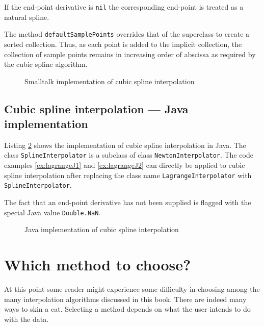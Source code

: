\documentclass[twoside]{book}
\begin{document}
If the end-point derivative is {\tt nil} the corresponding
end-point is treated as a natural spline.

The method {\tt defaultSamplePoints} overrides that of the
superclass to create a sorted collection. Thus, as each point is
added to the implicit collection, the collection of sample points
remains in increasing order of abscissa as required by the cubic
spline algorithm.

\begin{figure}\begin{listing} \caption{Smalltalk implementation of cubic spline interpolation} \label{ls:spline}

\end{listing}\end{figure}

\subsection{Cubic spline interpolation --- Java implementation}
Listing \ref{lj:spline} shows the implementation of cubic spline
interpolation in Java. The class {\tt SplineInterpolator} is a
subclass of class {\tt NewtonInterpolator}.  The code examples
\ref{ex:lagrangeJ1} and \ref{ex:lagrangeJ2} can directly be
applied to cubic spline interpolation after replacing the class
name {\tt LagrangeInterpolator} with {\tt SplineInterpolator}.

The fact that an end-point derivative has not been supplied is
flagged with the special Java value {\tt Double.NaN}.


\begin{figure}\begin{listing} \caption{Java implementation of cubic spline
interpolation}
\label{lj:spline}

\end{listing}\end{figure}

\section{Which method to choose?}
At this point some reader might experience some difficulty in
choosing among the many interpolation algorithms discussed in this
book. There are indeed many ways to skin a cat. Selecting a method
depends on what the user intends to do with the data.
\end{document}
